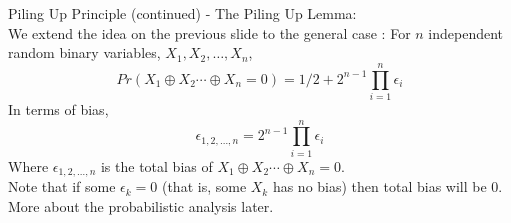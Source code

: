 \documentclass[9pt]{beamer}
\begin{document}
\begin{frame}
Piling Up Principle (continued) - The Piling Up Lemma:\\
\vspace{5mm}
We extend the idea on the previous slide to the general case \pause : For $n$ independent random binary variables, $X_1, X_2, \dots, X_n$, 
\[ Pr(X_1 \oplus X_2 \cdots \oplus X_n = 0) = 1/2 + 2^{n-1} \prod_{i=1}^n \epsilon_i \]
\pause In terms of bias,
\[ \epsilon_{1,2,\dots,n} = 2^{n-1} \prod_{i = 1}^n \epsilon_i \]
Where $\epsilon_{1,2,\dots,n}$ is the total bias of $X_1 \oplus X_2 \cdots \oplus X_n = 0$. \\
\vspace{5mm}
\pause Note that if some $\epsilon_k = 0$ (that is, some $X_k$ has no bias) then total bias will be $0$. More about the probabilistic analysis later.
\end{frame}
\end{document}
